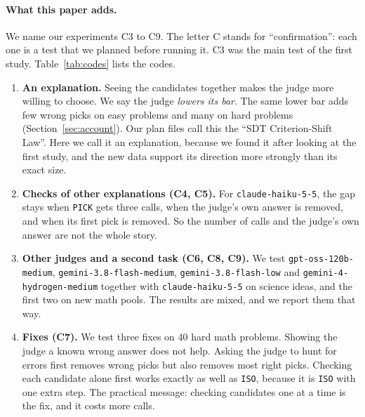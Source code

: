 \documentclass[10pt,twocolumn]{article}
\begin{document}
\paragraph{What this paper adds.}
We name our experiments C3 to C9. The letter C stands for ``confirmation'': each one is a test that we planned before running it. C3 was the main test of the first study. Table~\ref{tab:codes} lists the codes.
\begin{enumerate}\setlength{\itemsep}{2pt}
\item \textbf{An explanation.} Seeing the candidates together makes the judge more willing to choose. We say the judge \emph{lowers its bar}. The same lower bar adds few wrong picks on easy problems and many on hard problems (Section~\ref{sec:account}). Our plan files call this the ``SDT Criterion-Shift Law''. Here we call it an explanation, because we found it after looking at the first study, and the new data support its direction more strongly than its exact size.
\item \textbf{Checks of other explanations (C4, C5).} For \texttt{claude-haiku-5-5}, the gap stays when \texttt{PICK} gets three calls, when the judge's own answer is removed, and when its first pick is removed. So the number of calls and the judge's own answer are not the whole story.
\item \textbf{Other judges and a second task (C6, C8, C9).} We test \texttt{gpt-oss-120b-medium}, \texttt{gemini-3.8-flash-medium}, \texttt{gemini-3.8-flash-low} and \texttt{gemini-4-hydrogen-medium} together with \texttt{claude-haiku-5-5} on science ideas, and the first two on new math pools. The results are mixed, and we report them that way.
\item \textbf{Fixes (C7).} We test three fixes on 40 hard math problems. Showing the judge a known wrong answer does not help. Asking the judge to hunt for errors first removes wrong picks but also removes most right picks. Checking each candidate alone first works exactly as well as \texttt{ISO}, because it is \texttt{ISO} with one extra step. The practical message: checking candidates one at a time is the fix, and it costs more calls.
\end{enumerate}
\end{document}
